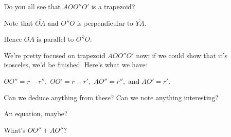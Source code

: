 Do you all see that $AOO''O'$ is a trapezoid?





Note that $\overline{OA}$ and $\overline{O''O}$ is perpendicular to $\overline{YA}$.

Hence $\overline{OA}$ is parallel to $\overline{O''O}$.

We're pretty focused on trapezoid $AOO''O'$ now; if we could show that it's isosceles, we'd be finished. Here's what we have:

$OO'' = r - r'',$ $OO' = r - r',$ $AO'' = r'',$ and $AO' = r'.$

Can we deduce anything from these? Can we note anything interesting?

An equation, maybe?

What's $OO'' + AO'' ?$










